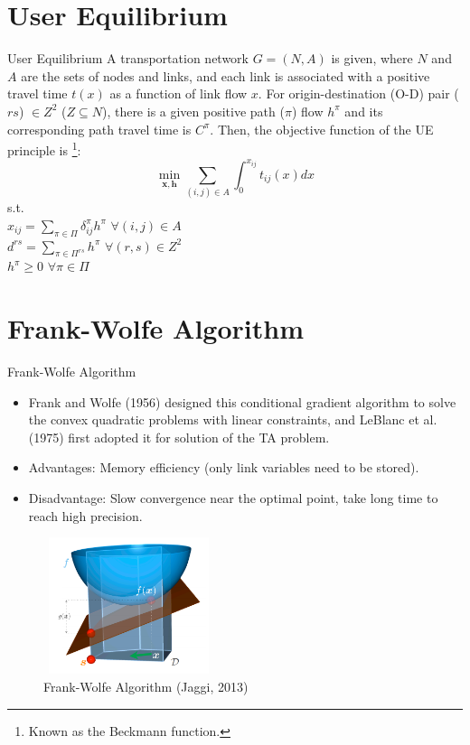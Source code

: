 \documentclass{beamer}
\newcommand{\vect}[1]{\boldsymbol{#1}}
\begin{document}
	\section{User Equilibrium}
		\begin{frame}{User Equilibrium}
		A transportation network $G = (N, A)$ is given, where $N$ and $A$ are the sets of nodes and links, and each link  is associated
		with a positive travel time $t(x)$ as a function of link flow $x$.  For origin-destination (O-D) pair ($rs$) $\in Z^2$ ($Z \subseteq N$), there is a given positive path ($\pi$) flow $h^\pi$ and its corresponding path travel time is $C^\pi$. Then, the objective function of the UE principle is \footnote{Known as the Beckmann function.}:
		$$ \min_{\vect{x},\vect{h}} \sum_{(i,j) \in A}^{} \int_{0}^{x_{ij}} {t}_{ij}(x)dx$$ 
		s.t. \\
		
		\hfill $ x_{ij}=\sum_{\pi \in \Pi} \delta_{ij}^\pi h^\pi$  \hspace{2cm}  $\forall (i,j) \in A$  \\
		\hfill $ d^{rs}=\sum_{\pi \in \Pi^{rs}} h^\pi$ \hspace{2.1cm}  $\forall (r,s) \in Z^2$ \\
		\hfill $ {h}^\pi \geq 0$ \hspace{3.7cm}  $\forall \pi \in \Pi$ \\

		\end{frame} 

\section{Frank-Wolfe Algorithm}
\begin{frame}{Frank-Wolfe Algorithm}
	\begin{itemize}

\item Frank and Wolfe (1956) designed this conditional gradient algorithm to solve the convex quadratic problems with linear constraints, and LeBlanc et al. (1975) first adopted it for solution of the TA problem.
\item Advantages: Memory efficiency (only link variables need to be stored).
\item Disadvantage: Slow convergence near the optimal point, take long time to reach high precision.
	\end{itemize}
\begin{figure}
	\includegraphics[width=5cm, height=4cm]{Fig/FrankWolfe.png}
	\caption{Frank-Wolfe Algorithm (Jaggi, 2013)}
\end{figure}
\end{frame}
\end{document}
